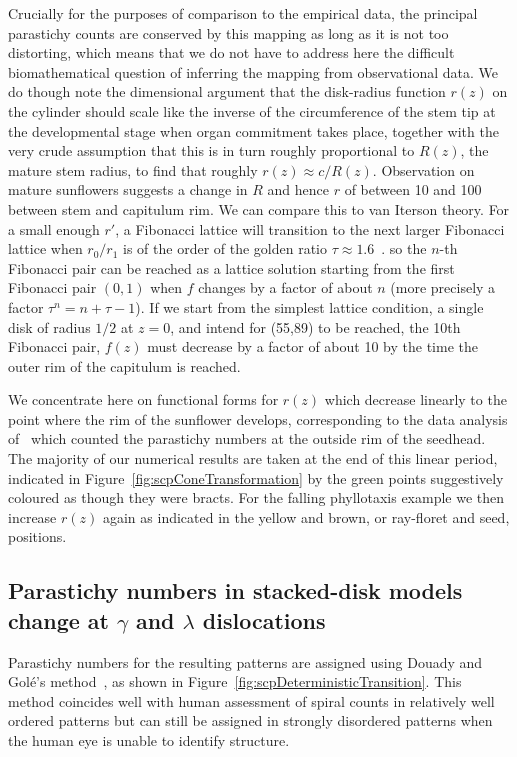 \documentclass[a4paper,10pt]{amsart}
\begin{document}
Crucially for the purposes of comparison to the empirical data, the principal parastichy counts are conserved by this mapping as long as it is not too distorting, which means that we do not have to address here the difficult biomathematical question of inferring the mapping from observational data. We do though note the dimensional argument that the disk-radius function $r(z)$ on the cylinder should scale like  the inverse of the circumference of the stem tip at the developmental stage when organ commitment takes place, together with the very crude assumption that this is in turn roughly proportional to $R(z)$, the mature stem radius, to find that roughly $r(z)\approx c/R(z)$. Observation on mature sunflowers suggests  a change in $R$ and hence $r$ of between 10 and 100 between stem and capitulum rim. 
We can compare this to van Iterson theory. For a small enough $r'$, a Fibonacci lattice will transition to the next larger Fibonacci lattice  when $r_0/r_1$ is of the order of the golden ratio  $\tau\approx1.6$~\cite{swintonMathematicalPhyllotaxis2023}. 
so the $n$-th Fibonacci pair can be reached  as a lattice solution starting from the first Fibonacci pair $(0,1)$ when $f$ changes by a factor of about $n$ (more precisely a factor $\tau^n=n+\tau-1$). If we start from the simplest lattice condition, a single disk of radius $1/2$ at $z=0$, and intend for (55,89) to be reached, the 10th Fibonacci pair, $f(z)$ must decrease by a factor of about 10 by the time the outer rim of the capitulum is reached.

We concentrate here on functional forms for $r(z)$ which decrease linearly to the point where the rim of the sunflower develops, corresponding to the data analysis of~\cite{swintonNovelFibonacciNonFibonacci2016} which counted the parastichy numbers at the outside rim of the seedhead. The majority of our numerical results are taken at the end of this linear  period, indicated in Figure~\ref{fig:scpConeTransformation} by the green points suggestively coloured as though they were bracts. For the falling phyllotaxis example we then increase  $r(z)$ again as indicated in the yellow and brown, or ray-floret and seed, positions. 



\subsection{Parastichy numbers in stacked-disk models change at $\gamma$ and $\lambda$ dislocations}
 Parastichy numbers for the resulting patterns are assigned using Douady and Gol\'e's method~\cite{goleFibonacciQuasisymmetricPhyllotaxis2016}, as shown in Figure~\ref{fig:scpDeterministicTransition}. This method coincides well with human assessment of spiral counts in relatively well ordered patterns but can still be assigned in strongly disordered patterns when the human eye is unable to identify structure. 
\end{document}
